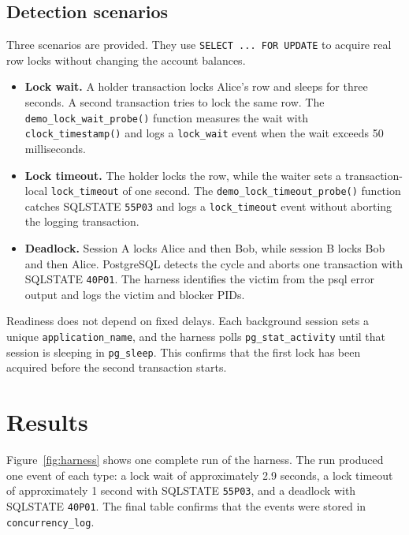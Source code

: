 \documentclass[11pt]{article}
\begin{document}
\subsection{Detection scenarios}

Three scenarios are provided. They use \texttt{SELECT ... FOR UPDATE} to
acquire real row locks without changing the account balances.

\begin{itemize}
    \item \textbf{Lock wait.} A holder transaction locks Alice's row and sleeps
    for three seconds. A second transaction tries to lock the same row. The
    \texttt{demo\_lock\_wait\_probe()} function measures the wait with
    \texttt{clock\_timestamp()} and logs a \texttt{lock\_wait} event when the
    wait exceeds 50 milliseconds.

    \item \textbf{Lock timeout.} The holder locks the row, while the waiter sets
    a transaction-local \texttt{lock\_timeout} of one second. The
    \texttt{demo\_lock\_timeout\_probe()} function catches SQLSTATE
    \texttt{55P03} and logs a \texttt{lock\_timeout} event without aborting the
    logging transaction.

    \item \textbf{Deadlock.} Session A locks Alice and then Bob, while session B
    locks Bob and then Alice. PostgreSQL detects the cycle and aborts one
    transaction with SQLSTATE \texttt{40P01}. The harness identifies the victim
    from the psql error output and logs the victim and blocker PIDs.
\end{itemize}

Readiness does not depend on fixed delays. Each background session sets a
unique \texttt{application\_\allowbreak name}, and the harness polls
\texttt{pg\_stat\_\allowbreak activity} until that session is sleeping in
\texttt{pg\_sleep}. This confirms that the first lock has been acquired before
the second transaction starts.

\section{Results}

Figure~\ref{fig:harness} shows one complete run of the harness. The run produced
one event of each type: a lock wait of approximately 2.9 seconds, a lock
timeout of approximately 1 second with SQLSTATE \texttt{55P03}, and a deadlock
with SQLSTATE \texttt{40P01}. The final table confirms that the events were
stored in \texttt{concurrency\_log}.
\end{document}
